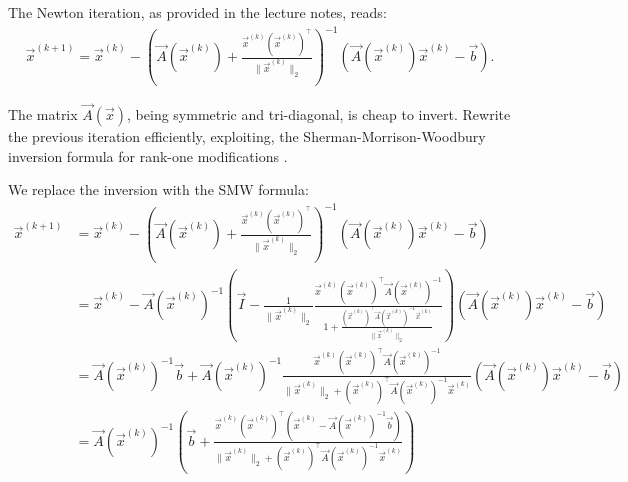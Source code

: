 \begin{problem}
\begin{subproblem}[1]
 \begin{solution}
 The Newton iteration, as provided in the lecture notes, reads:
\begin{align}
  \vec{x}^{(k+1)} = \vec{x}^{(k)} - \left( \vec{A}(\vec{x}^{(k)}) + \frac{\vec{x}^{(k)} (\vec{x}^{(k)})^\top}{\lVert \vec{x}^{(k)} \rVert_2}\right)^{-1} ( \vec{A}(\vec{x}^{(k)}) \vec{x}^{(k)} - \vec{b} ).
\end{align}
 \end{solution}

\end{subproblem}

\begin{subproblem}[3] \label{subprb:rewrite-SMW}
 The matrix $\vec{A}(\vec{x})$, being symmetric and tri-diagonal, is cheap to invert. Rewrite the previous iteration efficiently, exploiting, the Sherman-Morrison-Woodbury inversion formula for rank-one modifications .
 
 \begin{solution}
 We replace the inversion with the SMW formula:
 \begin{align*}
  \vec{x}^{(k+1)} & = \vec{x}^{(k)} - \left( \vec{A}(\vec{x}^{(k)}) + \frac{\vec{x}^{(k)} (\vec{x}^{(k)})^\top}{\lVert \vec{x}^{(k)} \rVert_2}\right)^{-1} ( \vec{A}(\vec{x}^{(k)}) \vec{x}^{(k)} - \vec{b} ) \\
  & = \vec{x}^{(k)} -  \vec{A}(\vec{x}^{(k)})^{-1} \left( \vec{I} - \frac{1}{\lVert \vec{x}^{(k)} \rVert_2} \frac{\vec{x}^{(k)} (\vec{x}^{(k)})^\top \vec{A}(\vec{x}^{(k)})^{-1} }{1 + \frac{(\vec{x}^{(k)})^\top \vec{A}(\vec{x}^{(k)})^{-1} \vec{x}^{(k)}}{\lVert \vec{x}^{(k)} \rVert_2} } \right) ( \vec{A}(\vec{x}^{(k)}) \vec{x}^{(k)} - \vec{b} ) \\
  & = \vec{A}(\vec{x}^{(k)})^{-1} \vec{b} + \vec{A}(\vec{x}^{(k)})^{-1} \frac{\vec{x}^{(k)} (\vec{x}^{(k)})^\top \vec{A}(\vec{x}^{(k)})^{-1} }{\lVert \vec{x}^{(k)} \rVert_2 + (\vec{x}^{(k)})^\top \vec{A}(\vec{x}^{(k)})^{-1} \vec{x}^{(k)} } ( \vec{A}(\vec{x}^{(k)}) \vec{x}^{(k)} - \vec{b} ) \\
  & = \vec{A}(\vec{x}^{(k)})^{-1} \left(\vec{b} + \frac{\vec{x}^{(k)} (\vec{x}^{(k)})^\top  ( \vec{x}^{(k)} - \vec{A}(\vec{x}^{(k)})^{-1} \vec{b} )}{\lVert \vec{x}^{(k)} \rVert_2 + (\vec{x}^{(k)})^\top \vec{A}(\vec{x}^{(k)})^{-1} \vec{x}^{(k)} } \right) \\
 \end{align*}
 \end{solution}

\end{subproblem}



\end{problem}
